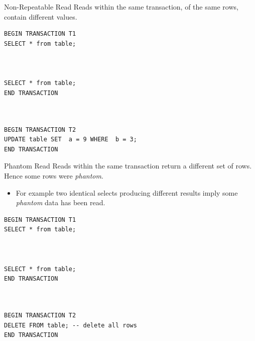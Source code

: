 \begin{definitionbox}{Non-Repeatable Read}
    Reads within the same transaction, of the same rows, contain different values.
    \tcblower
    \begin{minipage}[t]{.49\textwidth}
        \begin{verbatim}
BEGIN TRANSACTION T1
SELECT * from table;



SELECT * from table;
END TRANSACTION
       \end{verbatim}
    \end{minipage} \hfill \begin{minipage}[t]{.49\textwidth}
        \begin{verbatim}


BEGIN TRANSACTION T2
UPDATE table SET  a = 9 WHERE  b = 3;
END TRANSACTION

       \end{verbatim}
    \end{minipage}
\end{definitionbox}

\begin{definitionbox}{Phantom Read}
    Reads within the same transaction return a different set of rows. Hence some rows were \textit{phantom}.
    \begin{itemize}
        \item For example two identical selects producing different results imply some \textit{phantom} data has been read.
    \end{itemize}
    \tcblower
    \begin{minipage}[t]{.49\textwidth}
        \begin{verbatim}
BEGIN TRANSACTION T1
SELECT * from table;



SELECT * from table;
END TRANSACTION
       \end{verbatim}
    \end{minipage} \hfill \begin{minipage}[t]{.49\textwidth}
        \begin{verbatim}


BEGIN TRANSACTION T2
DELETE FROM table; -- delete all rows
END TRANSACTION

       \end{verbatim}
    \end{minipage}
\end{definitionbox}


